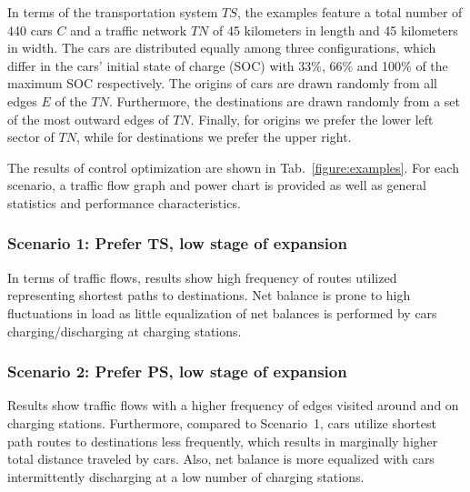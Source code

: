 
In terms of the transportation system $TS$, the examples feature a total number of 440 cars $C$ and a traffic network $TN$ of 45 kilometers in length and 45 kilometers in width. The cars are distributed equally among three configurations, which differ in the cars' initial state of charge (SOC) with 33\%, 66\% and 100\% of the maximum SOC respectively. The origins of cars are drawn randomly from all edges $E$ of the $TN$. Furthermore, the destinations are drawn randomly from a set of the most outward edges of $TN$. Finally, for origins we prefer the lower left sector of $TN$, while for destinations we prefer the upper right.

The results of control optimization are shown in Tab.~\ref{figure:examples}. For each scenario, a traffic flow graph and power chart is provided as well as general statistics and performance characteristics.

\subsubsection*{Scenario 1: Prefer TS, low stage of expansion} 

In terms of traffic flows, results show high frequency of routes utilized representing shortest paths to destinations. Net balance is prone to high fluctuations in load as little equalization of net balances is performed by cars charging/discharging at charging stations.


\subsubsection*{Scenario 2: Prefer PS, low stage of expansion}

Results show traffic flows with a higher frequency of edges visited around and on charging stations. Furthermore, compared to Scenario~1, cars utilize shortest path routes to destinations less frequently, which results in marginally higher total distance traveled by cars. Also, net balance is more equalized with cars intermittently discharging at a low number of charging stations.

